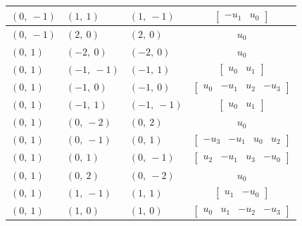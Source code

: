 \documentclass[11pt]{article}
\theoremstyle{definition}
\begin{document}
\begin{longtable}{|l|l|l|c|}
    \hline
    $\left( 0, \  -1\right)$ & $\left( 1, \  1\right)$ & $\left( 1, \  -1\right)$ & $\left[\begin{matrix}- u_{1} & u_{0}\end{matrix}\right]$ \\
    \hline
    $\left( 0, \  -1\right)$ & $\left( 2, \  0\right)$ & $\left( 2, \  0\right)$ & $u_{0}$ \\
    \hline
    $\left( 0, \  1\right)$ & $\left( -2, \  0\right)$ & $\left( -2, \  0\right)$ & $u_{0}$ \\
    \hline
    $\left( 0, \  1\right)$ & $\left( -1, \  -1\right)$ & $\left( -1, \  1\right)$ & $\left[\begin{matrix}u_{0} & u_{1}\end{matrix}\right]$ \\
    \hline
    $\left( 0, \  1\right)$ & $\left( -1, \  0\right)$ & $\left( -1, \  0\right)$ & $\left[\begin{matrix}u_{0} & - u_{1} & u_{2} & - u_{3}\end{matrix}\right]$ \\
    \hline
    $\left( 0, \  1\right)$ & $\left( -1, \  1\right)$ & $\left( -1, \  -1\right)$ & $\left[\begin{matrix}u_{0} & u_{1}\end{matrix}\right]$ \\
    \hline
    $\left( 0, \  1\right)$ & $\left( 0, \  -2\right)$ & $\left( 0, \  2\right)$ & $u_{0}$ \\
    \hline
    $\left( 0, \  1\right)$ & $\left( 0, \  -1\right)$ & $\left( 0, \  1\right)$ & $\left[\begin{matrix}- u_{3} & - u_{1} & u_{0} & u_{2}\end{matrix}\right]$ \\
    \hline
    $\left( 0, \  1\right)$ & $\left( 0, \  1\right)$ & $\left( 0, \  -1\right)$ & $\left[\begin{matrix}u_{2} & - u_{1} & u_{3} & - u_{0}\end{matrix}\right]$ \\
    \hline
    $\left( 0, \  1\right)$ & $\left( 0, \  2\right)$ & $\left( 0, \  -2\right)$ & $u_{0}$ \\
    \hline
    $\left( 0, \  1\right)$ & $\left( 1, \  -1\right)$ & $\left( 1, \  1\right)$ & $\left[\begin{matrix}u_{1} & - u_{0}\end{matrix}\right]$ \\
    \hline
    $\left( 0, \  1\right)$ & $\left( 1, \  0\right)$ & $\left( 1, \  0\right)$ & $\left[\begin{matrix}u_{0} & u_{1} & - u_{2} & - u_{3}\end{matrix}\right]$ \\

\end{longtable}
\end{document}
